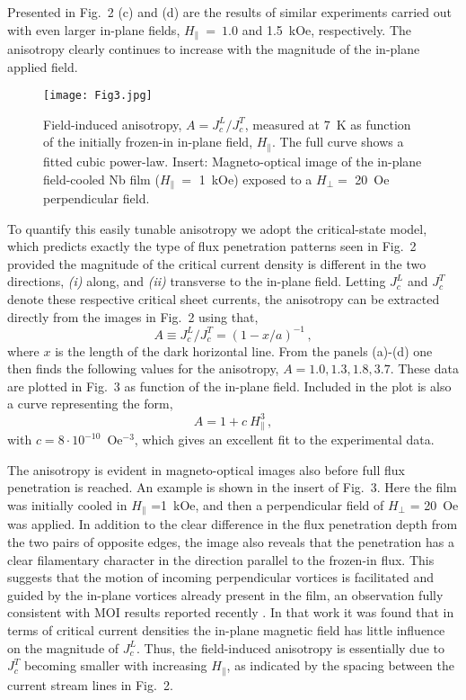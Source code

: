 \documentclass[superscriptaddress,twocolumn,aps,
showpacs]{revtex4-1}
\begin{document}
Presented in Fig.~2 (c) and (d) are the results of similar experiments carried out with even larger in-plane fields, $H_{\parallel}~=~1.0$ and 1.5~kOe, respectively.
The anisotropy clearly continues to increase with the magnitude of the in-plane applied field.
  
\begin{figure}[t]
  \centering
  \texttt{[image: Fig3.jpg]}
  \label{fig:power}
  \caption{Field-induced anisotropy,  $A = J_c^{L}/J_c^{T}$, measured at 7~K as function of the initially frozen-in in-plane field, $H_{\parallel}$.  
  The full curve shows a fitted cubic power-law. Insert: Magneto-optical image of the in-plane field-cooled Nb film ($H_{\parallel}~=$ 1~kOe) exposed to a $H_{\perp} =$ 20~Oe perpendicular field.}
\end{figure}

To quantify this easily tunable anisotropy we adopt the critical-state model, which predicts  exactly the type of flux penetration patterns seen in Fig.~2
provided the magnitude of the critical current density is different in the two directions, {\it (i)} along, and {\it  (ii)} transverse to the in-plane field.
Letting $J_c^{L}$ and  $J_c^{T}$ denote these respective critical sheet currents, the anisotropy can be extracted directly from the images in Fig.~2 using that,
\begin{equation}
A \equiv J_c^{L}/J_c^{T} = (1 - x/a)^{-1} \, ,
\end{equation}
where $x$ is the length of the dark horizontal line.
From the panels (a)-(d)  one then finds the following values for the anisotropy, $ A = 1.0 , 1.3, 1.8, 3.7$.
These data  are plotted in Fig.~3 as function of the in-plane field. Included in the plot is  also a curve representing  the form,
\begin{equation}
 A   = 1+ c~ H_{\parallel}^3  \, ,
\end{equation}
with $c = 8 \cdot 10^{-10}$~Oe$^{-3}$, which gives an excellent fit to the experimental data. 

The anisotropy is evident in magneto-optical images also before full flux penetration is reached. 
An example is shown in the insert of Fig.~3.
Here the film was initially cooled in $H_{\parallel}$ =1~kOe, and then a perpendicular field of $H_{\perp}$ = 20~Oe was applied.
In addition to the clear difference in the flux penetration depth from the two pairs of opposite edges, the image also reveals that the penetration has a clear filamentary character in the direction parallel to the frozen-in flux.
This suggests that the motion of incoming perpendicular vortices is facilitated and  guided by the in-plane vortices already present in the film, an observation fully consistent with MOI results reported recently \cite{colauto_anisotropic_2017}.
In that work it was  found that in terms of critical current densities the in-plane magnetic field has little influence on the magnitude of $J_c^{L}$. 
Thus, the field-induced anisotropy is essentially due to $J_c^{T}$ becoming smaller with increasing $H_{\parallel}$, as indicated by the spacing between the current stream lines in Fig.~2.
 
\end{document}
